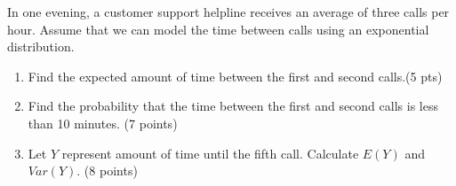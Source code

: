 
\item In one evening, a customer support helpline receives an average of three calls per hour. Assume that we can model the time between calls using an exponential distribution.

\begin{enumerate}

\item Find the expected amount of time between the first and second calls.(5 pts)

\vfill

\item Find the probability that the time between the first and second calls is less than 10 minutes. (7 points)

\vfill


\item Let $Y$ represent amount of time until the fifth call. Calculate $E(Y)$ and $Var(Y)$. (8 points)

\vfill

\end{enumerate}
